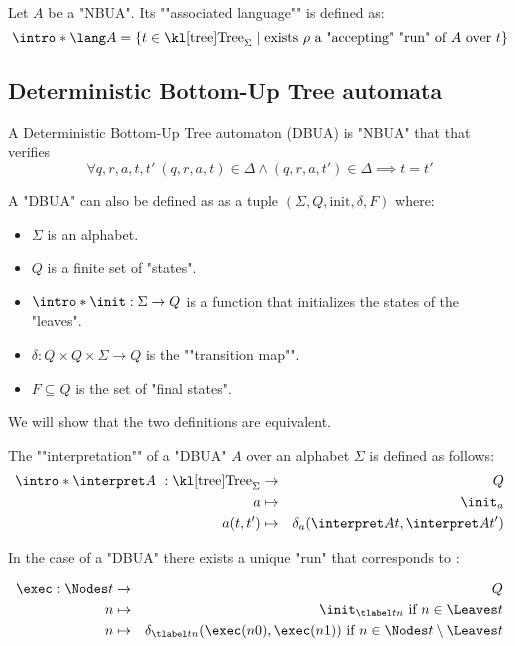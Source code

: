 \documentclass{article}
\begin{document}
\begin{definition}
	Let $A$ be a "NBUA". Its ""associated language"" is defined as:
	\[\intro* \lang A = \setdef {t \in \tree_{\Sigma}} {\text{exists $\rho$ a "accepting" "run" of $A$ over $t$}} \]
\end{definition}

\subsection{Deterministic Bottom-Up Tree automata}

\begin{definition}
	A Deterministic Bottom-Up Tree automaton (DBUA) is "NBUA" that that verifies
	\[ \forall q,r,a,t,t' \ (q,r,a,t) \in \Delta \land   (q,r,a,t') \in \Delta  \implies t = t' \]
\end{definition}


\begin{remark}
	A "DBUA" can also be defined as as a tuple $(\Sigma, Q, \text{init}, \delta, F)$ where:
	\begin{itemize}
		\item $\Sigma$ is an alphabet.
		\item $Q$ is a finite set of "states".
		\item $\intro *\init : \Sigma \to Q$ is a function that initializes the states of the "leaves".
		\item $\delta : Q \times Q \times \Sigma \to Q$ is the ""transition map"".
		\item $F \subseteq Q$ is the set of "final states".
	\end{itemize}
	We will show that the two definitions are equivalent.
\end{remark}

\begin{definition}
	The ""interpretation"" of a "DBUA" $A$  over an alphabet $\Sigma$ is defined as follows:
	\begin{eqnarray*}
		\intro* \interpret A ~: \tree_{\Sigma} &\to& Q \\
		a &\mapsto& \init_a \\
		a(t,t') &\mapsto& \delta_a (\interpret A t, \interpret A {t'})
	\end{eqnarray*}
\end{definition}

\begin{remark}
	In the case of a "DBUA" there exists a unique "run" that corresponds to :

	\begin{eqnarray*}
		\exec : \Nodes t &\to & Q \\
		n  &\mapsto& \init_{\tlabel t n} \text{ if } n \in \Leaves t \\
		n  &\mapsto& \delta_{\tlabel t n}(\exec (n0), \exec (n1)) \text{ if } n \in \Nodes t \setminus \Leaves t
	\end{eqnarray*}
\end{remark}
\end{document}
